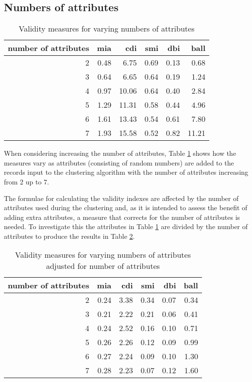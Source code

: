 \documentclass[conference]{IEEEtran}
\begin{document}
\subsection{Numbers of attributes}

\begin{table}[ht]
\begin{center}
\caption{Validity measures for varying numbers of attributes}
\label{table-measures-attr}
\begin{tabular}{rrrrrr}
  \hline
 number of attributes & mia & cdi & smi & dbi & ball \\ 
  \hline 
2 & 0.48 & 6.75 & 0.69 & 0.13 & 0.68 \\ 
3 & 0.64 & 6.65 & 0.64 & 0.19 & 1.24 \\ 
4 & 0.97 & 10.06 & 0.64 & 0.40 & 2.84 \\ 
5 & 1.29 & 11.31 & 0.58 & 0.44 & 4.96 \\ 
6 & 1.61 & 13.43 & 0.54 & 0.61 & 7.80 \\ 
7 & 1.93 & 15.58 & 0.52 & 0.82 & 11.21 \\ 
   \hline
\end{tabular}
\end{center}
\end{table}

When considering increasing the number of attributes, Table \ref{table-measures-attr} shows how the measures vary as attributes (consisting of random numbers) are added to the records input to the clustering algorithm with the number of attributes increasing from 2 up to 7.

The formulae for calculating the validity indexes are affected by the number of attributes used during the clustering and, as it is intended to assess the benefit of adding extra attributes, a measure that corrects for the number of attributes is needed. To investigate this the attributes in Table \ref{table-measures-attr} are divided by the number of attributes to produce the results in Table \ref{table-measures-attr-divide}.

\begin{table}[ht]
\begin{center}
\caption{Validity measures for varying numbers of attributes adjusted for number of attributes}
\label{table-measures-attr-divide}
\begin{tabular}{rrrrrr}
  \hline
 number of attributes & mia & cdi & smi & dbi & ball \\ 
  \hline 
  2 & 0.24 & 3.38 & 0.34 & 0.07 & 0.34 \\ 
  3 & 0.21 & 2.22 & 0.21 & 0.06 & 0.41 \\ 
  4 & 0.24 & 2.52 & 0.16 & 0.10 & 0.71 \\ 
  5 & 0.26 & 2.26 & 0.12 & 0.09 & 0.99 \\ 
  6 & 0.27 & 2.24 & 0.09 & 0.10 & 1.30 \\ 
  7 & 0.28 & 2.23 & 0.07 & 0.12 & 1.60 \\   
   \hline
\end{tabular}
\end{center}
\end{table}
\end{document}

